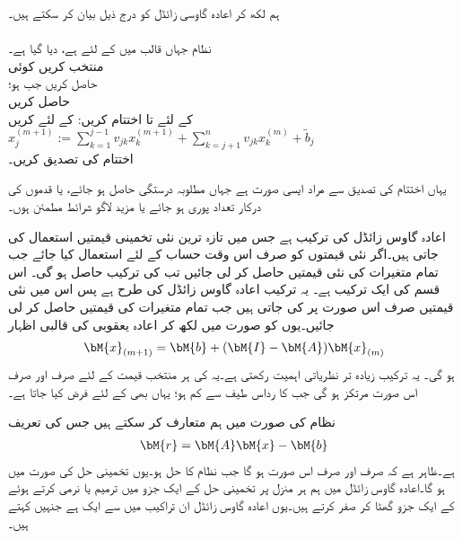 ہم  لکھ کر اعادہ گاوسی زائڈل کو درج ذیل بیان کر سکتے ہیں۔\\

\noindent\makebox[\linewidth]{\rule{\textwidth}{0.4pt}}
\\
نظام  جہاں  قالب  میں  کے لئے  ہے، دیا گیا ہے۔\\
منتخب کریں کوئی \\
حاصل کریں  جب  ہو؛ \\
حاصل کریں \\
 کے لئے  تا اختتام کریں:
 کے لئے کریں\\
$x_j^{(m+1)}:=\sum\limits_{k=1}^{j-1}v_{jk}x_k^{(m+1)}+\sum\limits_{k=j+1}^{n}v_{jk}x_k^{(m)}+\tilde{b}_j$\\
اختتام کی تصدیق کریں۔\\
\noindent\makebox[\linewidth]{\rule{\textwidth}{0.4pt}}

یہاں اختتام کی تصدیق سے مراد ایسی صورت ہے جہاں مطلوبہ درستگی حاصل ہو جائے، یا قدموں کی درکار تعداد پوری ہو جائے یا مزید لاگو شرائط مطمئن ہوں۔

اعادہ گاوس زائڈل  کی ترکیب ہے جس میں تازہ ترین نئی تخمینی قیمتیں استعمال کی جاتی ہیں۔اگر  نئی قیمتوں کو صرف اس وقت حساب کے لئے استعمال کیا جائے جب تمام متغیرات کی نئی قیمتیں حاصل کر لی جائیں تب  کی ترکیب حاصل ہو گی۔ اس قسم کی ایک ترکیب ہے۔ یہ ترکیب اعادہ گاوس زائڈل کی طرح ہے پس اس میں نئی قیمتیں صرف اس صورت پر کی جاتی ہیں جب تمام متغیرات کی قیمتیں حاصل کر لی جائیں۔یوں  کو  صورت میں لکھ کر اعادہ یعقوبی کی قالبی اظہار
\begin{align}\label{مساوات_خطی_اعدادی_مثال_ث}
\bM{x}_{(m+1)}=\bM{b}+(\bM{I}-\bM{A})\bM{x}_{(m)}
\end{align}
ہو گی۔ یہ ترکیب زیادہ تر نظریاتی اہمیت رکھتی ہے۔یہ  کی ہر منتخب قیمت کے لئے صرف اور صرف اس صورت مرتکز ہو گی جب    کا رداس طیف  سے کم ہو؛ یہاں بھی  کے لئے  فرض کیا جاتا ہے۔

نظام  کی صورت میں ہم    متعارف کر سکتے ہیں جس کی تعریف
\begin{align*}
\bM{r}=\bM{A}\bM{x}-\bM{b}
\end{align*}
ہے۔ظاہر ہے کہ  صرف اور صرف اس صورت ہو گا جب  نظام کا حل ہو۔یوں تخمینی حل کی صورت میں  ہو گا۔اعادہ گاوس زائڈل میں ہم ہر منزل پر تخمینی حل کے ایک جزو میں ترمیم یا نرمی  کرتے ہوئے  کے ایک جزو  گھٹا کر صفر کرتے ہیں۔یوں اعادہ گاوس زائڈل ان تراکیب میں سے ایک ہے جنہیں  کہتے ہیں۔ 


